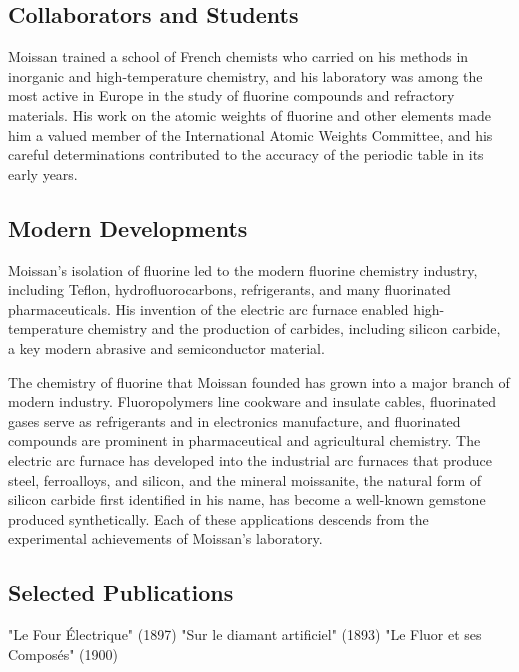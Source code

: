 \subsection*{Collaborators and Students}

Moissan trained a school of French chemists who carried on his methods in inorganic and high-temperature chemistry, and his laboratory was among the most active in Europe in the study of fluorine compounds and refractory materials. His work on the atomic weights of fluorine and other elements made him a valued member of the International Atomic Weights Committee, and his careful determinations contributed to the accuracy of the periodic table in its early years.

\subsection*{Modern Developments}

Moissan's isolation of fluorine led to the modern fluorine chemistry industry, including Teflon, hydrofluorocarbons, refrigerants, and many fluorinated pharmaceuticals. His invention of the electric arc furnace enabled high-temperature chemistry and the production of carbides, including silicon carbide, a key modern abrasive and semiconductor material.

The chemistry of fluorine that Moissan founded has grown into a major branch of modern industry. Fluoropolymers line cookware and insulate cables, fluorinated gases serve as refrigerants and in electronics manufacture, and fluorinated compounds are prominent in pharmaceutical and agricultural chemistry. The electric arc furnace has developed into the industrial arc furnaces that produce steel, ferroalloys, and silicon, and the mineral moissanite, the natural form of silicon carbide first identified in his name, has become a well-known gemstone produced synthetically. Each of these applications descends from the experimental achievements of Moissan's laboratory.

\subsection*{Selected Publications}

"Le Four Électrique" (1897)
"Sur le diamant artificiel" (1893)
"Le Fluor et ses Composés" (1900)
